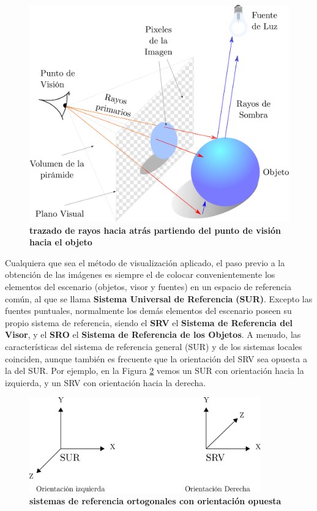  \begin{figure}[h]
    \includegraphics[width=12cm]{Img/GEO/geo-ojo1.png}
    \centering
    \caption{\textbf{\footnotesize{trazado de rayos hacia atrás partiendo del punto de visión hacia el objeto}}}
    \label{fig:ojo}
    \end{figure}
    
Cualquiera que sea el método de visualización aplicado, el paso previo a la obtención de las imágenes es siempre el de colocar convenientemente los elementos del escenario (objetos, visor y fuentes) en un espacio de referencia
común, al que se llama \textbf{Sistema Universal de Referencia} \textbf{(SUR)}. Excepto las fuentes puntuales, normalmente los demás elementos del escenario poseen su propio sistema de referencia, siendo el \textbf{SRV} el \textbf{Sistema de Referencia del Visor}, y el \textbf{SRO} el \textbf{Sistema de Referencia de los Objetos}.
A menudo, las características del sistema de referencia general (SUR) y de los sistemas locales coinciden, aunque también es frecuente que la orientación del SRV sea opuesta a la del SUR. Por ejemplo, en la Figura \ref{fig:grafica8} vemos un SUR con orientación hacia la izquierda, y un SRV con orientación hacia la derecha.

 \begin{figure}[h]
    \includegraphics[width=10cm]{Img/CPD/grafica8.png}
    \centering
    \caption{\textbf{\footnotesize{ sistemas de referencia ortogonales con orientación opuesta }}}
    \label{fig:grafica8}
    \end{figure}
    

